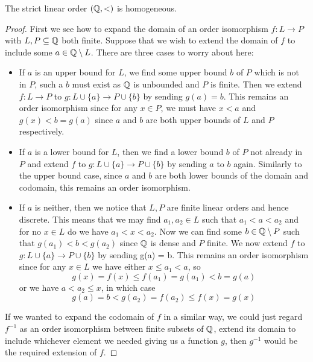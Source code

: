 \begin{prop}
  The strict linear order $(\mathbb{Q},<)$ is homogeneous.
\end{prop}
\begin{proof}
  First we see how to expand the
  domain of an order isomorphism $f : L \to P$ with $L, P \subseteq \mathbb{Q}$ both finite. Suppose that we
  wish to extend the domain of $f$ to include some $a \in \mathbb{Q} \setminus L$. There are three cases to
  worry about here:
  \begin{itemize}
    \item If $a$ is an upper bound for $L$, we find some upper bound $b$ of $P$ which is
      not in $P$, such a $b$ must exist as $\mathbb{Q}$ is unbounded and $P$ is finite. Then we extend
      $f : L \to P$ to $g : L \cup \{a\} \to P \cup \{b\}$ by sending $g(a) = b$. This remains an
      order isomorphism since for any $x \in P$, we must have $x < a$ and $g(x) < b = g(a)$ since
      $a$ and $b$ are both upper bounds of $L$ and $P$ respectively.
    \item If $a$ is a lower bound for $L$, then we find a lower bound $b$ of $P$ not already in
      $P$ and extend $f$ to $g : L \cup \{a\} \to P \cup \{b\}$ by sending $a$ to $b$ again.
      Similarly to the upper bound case, since $a$ and $b$ are both lower bounds of the domain and
      codomain, this remains an order isomorphism.
    \item If $a$ is neither, then we notice that $L,P$ are finite linear orders and hence discrete.
      This means that we may find $a_1,a_2 \in L$ such that $a_1 < a < a_2$ and for no $x \in L$ do
      we have $a_1 < x < a_2$. Now we can find some $b \in \mathbb{Q} \setminus P$ such that
      $g(a_1) < b < g(a_2)$ since $\mathbb{Q}$ is dense and $P$ finite. We now extend $f$ to
      $g : L \cup \{a\} \to P \cup \{b\}$ by sending g(a) = b. This remains an order isomorphism
      since for any $x \in L$ we have either $x \leq a_1 < a$, so
      \begin{equation*}
        g(x) = f(x) \leq f(a_1) = g(a_1) < b = g(a)
      \end{equation*}
      or we have $a < a_2 \leq x$, in which case
      \begin{equation*}
        g(a) = b < g(a_2) = f(a_2) \leq f(x) = g(x)
      \end{equation*}
  \end{itemize}
  If we wanted to expand the codomain of $f$ in a similar way, we could just regard $f^{-1}$ as
  an order isomorphism between finite subsets of $\mathbb{Q}$, extend its domain to include whichever
  element we needed giving us a function $g$, then $g^{-1}$ would be the required extension of $f$.


\end{proof}

